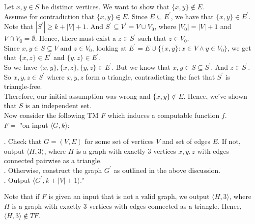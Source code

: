 \documentclass[12pt]{article}
\begin{document}
Let $x,y \in S$ be distinct vertices. We want to show that $\{x,y\} \not \in E$. \\

Assume for contradiction that $\{x,y\} \in E$. Since $E \subseteq E^\prime$, we have that $\{x,y\} \in E^\prime$. \\

Note that $|S^\prime| \geq k + |V| + 1$. And $S^\prime \subseteq V^\prime = V \cup V_0$, where $|V_0| = |V| + 1$ and $V \cap V_0 = \emptyset$. Hence, there must exist a $z \in S^\prime$ such that $z \in V_0$. \\

Since $x,y \in S \subseteq V$ and $z \in V_0$, looking at $E^\prime = E \cup \{\{x,y\} : x \in V \land y \in V_0\}$, we get that $\{x,z\} \in E^\prime$ and $\{y,z\} \in E^\prime$. \\

So we have $\{x,y\}, \{x,z\}, \{y,z\} \in E^\prime$. But we know that $x,y \in S \subseteq S^\prime$. And $z \in S^\prime$. So $x,y,z \in S^\prime$ where $x,y,z$ form a triangle, contradicting the fact that $S^\prime$ is triangle-free. \\

Therefore, our initial assumption was wrong and $\{x,y\} \not \in E$. Hence, we've shown that $S$ is an independent set. \\

Now consider the following TM $F$ which induces a computable function $f$. \\

$F = $ "on input $\langle G, k \rangle$: \\

\setlength\parindent{15pt}

. Check that $G = (V, E)$ for some set of vertices $V$ and set of edges $E$. If not, output $\langle H, 3 \rangle$, where $H$ is a graph with exactly 3 vertices $x,y,z$ with edges connected pairwise as a triangle. \\

. Otherwise, construct the graph $G^\prime$ as outlined in the above discussion. \\

. Output $\langle G^\prime, k + |V| + 1 \rangle$." \\
\setlength\parindent{0pt}

Note that if $F$ is given an input that is not a valid graph, we output $\langle H, 3 \rangle$, where $H$ is a graph with exactly 3 vertices with edges connected as a triangle. Hence, $\langle H, 3 \rangle \not \in TF$. \\
\end{document}
